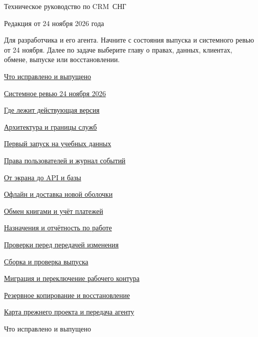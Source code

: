 \documentclass[12pt,a4paper]{article}
\newcommand{\booktitle}[1]{{\fontsize{29}{34}\selectfont #1\par}}
\newcommand{\chapterhead}[1]{{\fontsize{23}{27}\selectfont #1\par}\vspace{5pt}}
\newcommand{\subhead}[1]{\par\vspace{4pt}{\large\sffamily\bfseries\color{accent}#1\par}\nopagebreak}
\begin{document}
\booktitle{Техническое руководство по CRM~СНГ}
{\small\sffamily\color{muted}Редакция от 24 ноября 2026 года\par}
Для разработчика и его агента. Начните с состояния выпуска и системного ревью от 24 ноября. Далее по задаче выберите главу о правах, данных, клиентах, обмене, выпуске или восстановлении.
\subhead{Содержание}
{\sffamily\hyperref[ch1]{Что исправлено и выпущено\dotfill\pageref*{ch1}}\par}
{\sffamily\hyperref[ch2]{Системное ревью 24 ноября 2026\dotfill\pageref*{ch2}}\par}
{\sffamily\hyperref[ch3]{Где лежит действующая версия\dotfill\pageref*{ch3}}\par}
{\sffamily\hyperref[ch4]{Архитектура и границы служб\dotfill\pageref*{ch4}}\par}
{\sffamily\hyperref[ch5]{Первый запуск на учебных данных\dotfill\pageref*{ch5}}\par}
{\sffamily\hyperref[ch6]{Права пользователей и журнал событий\dotfill\pageref*{ch6}}\par}
{\sffamily\hyperref[ch7]{От экрана до API и базы\dotfill\pageref*{ch7}}\par}
{\sffamily\hyperref[ch8]{Офлайн и доставка новой оболочки\dotfill\pageref*{ch8}}\par}
{\sffamily\hyperref[ch9]{Обмен книгами и учёт платежей\dotfill\pageref*{ch9}}\par}
{\sffamily\hyperref[ch10]{Назначения и отчётность по работе\dotfill\pageref*{ch10}}\par}
{\sffamily\hyperref[ch11]{Проверки перед передачей изменения\dotfill\pageref*{ch11}}\par}
{\sffamily\hyperref[ch12]{Сборка и проверка выпуска\dotfill\pageref*{ch12}}\par}
{\sffamily\hyperref[ch13]{Миграция и переключение рабочего контура\dotfill\pageref*{ch13}}\par}
{\sffamily\hyperref[ch14]{Резервное копирование и восстановление\dotfill\pageref*{ch14}}\par}
{\sffamily\hyperref[ch15]{Карта прежнего проекта и передача агенту\dotfill\pageref*{ch15}}\par}
\clearpage
{}
\label{ch1}\chapterhead{Что исправлено и выпущено}
\end{document}

